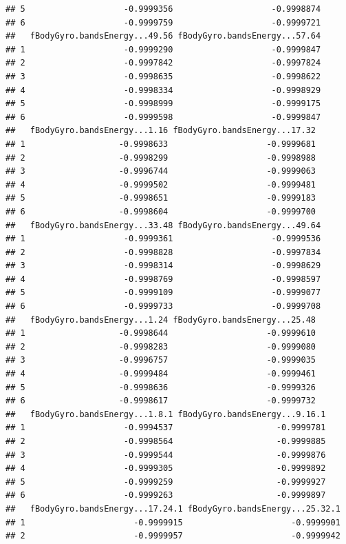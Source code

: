 \documentclass[
]{article}
\begin{document}
\begin{verbatim}
## 5                    -0.9999356                    -0.9998874
## 6                    -0.9999759                    -0.9999721
##   fBodyGyro.bandsEnergy...49.56 fBodyGyro.bandsEnergy...57.64
## 1                    -0.9999290                    -0.9999847
## 2                    -0.9997842                    -0.9997824
## 3                    -0.9998635                    -0.9998622
## 4                    -0.9998334                    -0.9998929
## 5                    -0.9998999                    -0.9999175
## 6                    -0.9999598                    -0.9999847
##   fBodyGyro.bandsEnergy...1.16 fBodyGyro.bandsEnergy...17.32
## 1                   -0.9998633                    -0.9999681
## 2                   -0.9998299                    -0.9998988
## 3                   -0.9996744                    -0.9999063
## 4                   -0.9999502                    -0.9999481
## 5                   -0.9998651                    -0.9999183
## 6                   -0.9998604                    -0.9999700
##   fBodyGyro.bandsEnergy...33.48 fBodyGyro.bandsEnergy...49.64
## 1                    -0.9999361                    -0.9999536
## 2                    -0.9998828                    -0.9997834
## 3                    -0.9998314                    -0.9998629
## 4                    -0.9998769                    -0.9998597
## 5                    -0.9999109                    -0.9999077
## 6                    -0.9999733                    -0.9999708
##   fBodyGyro.bandsEnergy...1.24 fBodyGyro.bandsEnergy...25.48
## 1                   -0.9998644                    -0.9999610
## 2                   -0.9998283                    -0.9999080
## 3                   -0.9996757                    -0.9999035
## 4                   -0.9999484                    -0.9999461
## 5                   -0.9998636                    -0.9999326
## 6                   -0.9998617                    -0.9999732
##   fBodyGyro.bandsEnergy...1.8.1 fBodyGyro.bandsEnergy...9.16.1
## 1                    -0.9994537                     -0.9999781
## 2                    -0.9998564                     -0.9999885
## 3                    -0.9999544                     -0.9999876
## 4                    -0.9999305                     -0.9999892
## 5                    -0.9999259                     -0.9999927
## 6                    -0.9999263                     -0.9999897
##   fBodyGyro.bandsEnergy...17.24.1 fBodyGyro.bandsEnergy...25.32.1
## 1                      -0.9999915                      -0.9999901
## 2                      -0.9999957                      -0.9999942

\end{verbatim}
\end{document}
